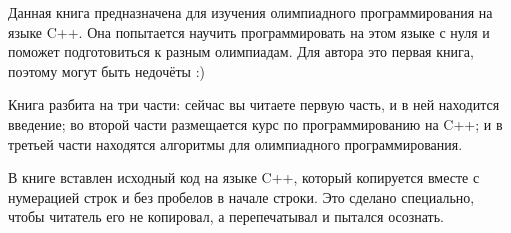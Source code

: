 Данная книга предназначена для изучения олимпиадного программирования на языке C++. Она попытается научить программировать на этом языке с нуля и поможет подготовиться к разным олимпиадам. Для автора это первая книга, поэтому могут быть недочёты :)

Книга разбита на три части: сейчас вы читаете первую часть, и в ней находится введение; во второй части размещается курс по программированию на C++; и в третьей части находятся алгоритмы для олимпиадного программирования.

В книге вставлен исходный код на языке C++, который копируется вместе с нумерацией строк и без пробелов в начале строки. Это сделано специально, чтобы читатель его не копировал, а перепечатывал и пытался осознать.
